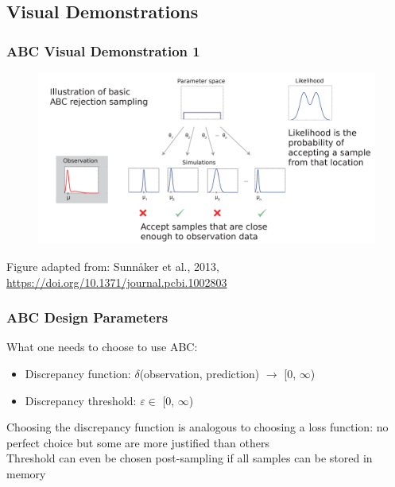 \documentclass{beamer}
\begin{document}
\subsection{Visual Demonstrations}

\begin{frame}
\frametitle{ABC Visual Demonstration 1}
\vspace{-1em}
\begin{figure}[ht]
\centerline{\includegraphics[width=\columnwidth]{img/abc1.png}}
\end{figure}
\vspace{-1em}
\tiny{Figure adapted from: Sunn{\aa}ker et al., 2013, \url{https://doi.org/10.1371/journal.pcbi.1002803}}
\end{frame}

\begin{frame}
\frametitle{ABC Design Parameters}
What one needs to choose to use ABC:
\begin{itemize}
\item Discrepancy function: $\delta$(observation, prediction) $\rightarrow$ [0, $\infty$)
\item Discrepancy threshold: $\varepsilon \in$ [0, $\infty$)
\end{itemize}
\medskip
Choosing the discrepancy function is analogous to choosing a loss function: no perfect choice but some are more justified than others\\
\medskip
Threshold can even be chosen post-sampling if all samples can be stored in memory
\end{frame}

\newcommand{\filmslide}[1]{
\begin{frame}
 \frametitle{ABC Visual Demonstration 2}
 \begin{figure}[ht]
 \begin{center}
 \texttt{[image: ./film/\#1.png]}
 \end{center}
 \end{figure}
 \bigskip
 \tiny{From (slides): Kangasr\"a\"asi\"o et al., 2017, \url{http://dl.acm.org/citation.cfm?id=3025576}}\\
 \tiny{Algorithm: Gutmann \& Corander, 2016, \url{http://jmlr.org/papers/v17/15-017.html}}
\end{frame}
}
\end{document}
